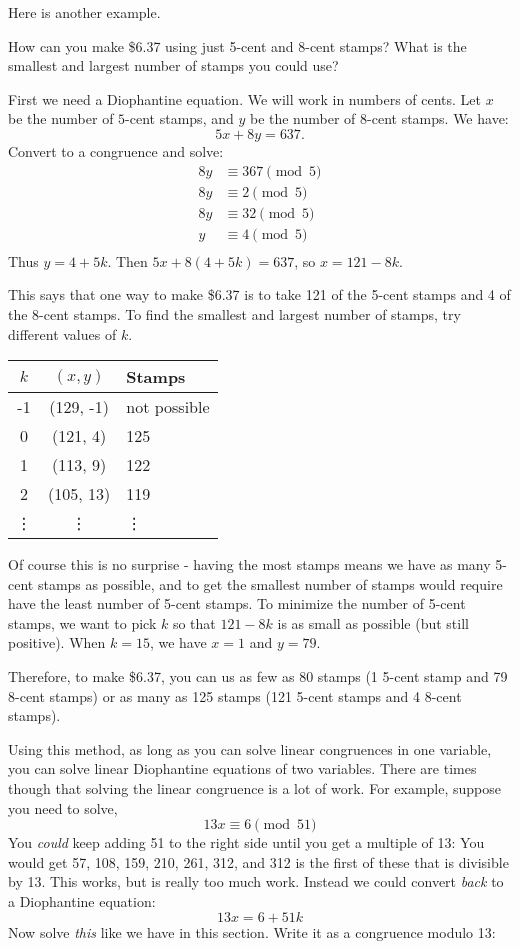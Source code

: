 \documentclass[12pt]{article}
\begin{document}
Here is another example.

\begin{example}
	How can you make \$6.37 using just 5-cent and 8-cent stamps?  What is the smallest and largest number of stamps you could use?
	
	\begin{solution}
		First we need a Diophantine equation.  We will work in numbers of cents.  Let $x$ be the number of $5$-cent stamps, and $y$ be the number of 8-cent stamps.  We have:
		\[5x + 8y = 637.\]
		Convert to a congruence and solve:
		\[
		\begin{aligned}
			8y & \equiv 367 \pmod{5}\\
				8y & \equiv 2 \pmod 5\\
				8y & \equiv 32 \pmod 5\\
				y & \equiv 4 \pmod 5\\
		\end{aligned}
		\]
		Thus $y = 4 + 5k$.  Then $5x + 8(4+5k) = 637$, so $x = 121 - 8k$.
		
		This says that one way to make \$6.37 is to take 121 of the 5-cent stamps and 4 of the 8-cent stamps.  To find the smallest and largest number of stamps, try different values of $k$.
		
		\begin{tabular}{c|c|l}
			$k$ & $(x,y)$ & Stamps\\ \hline
			-1 & (129, -1) & not possible \\
			0 & (121, 4) & 125 \\
			1 & (113, 9) & 122 \\
			2 & (105, 13) & 119 \\
			\vdots & \vdots & \vdots
		\end{tabular}
		
		Of course this is no surprise - having the most stamps means we have as many 5-cent stamps as possible, and to get the smallest number of stamps would require have the least number of 5-cent stamps.  To minimize the number of 5-cent stamps, we want to pick $k$ so that $121-8k$ is as small as possible (but still positive).  When $k = 15$, we have $x = 1$ and $y = 79$.
		
		Therefore, to make \$6.37, you can us as few as 80 stamps (1 5-cent stamp and 79 8-cent stamps) or as many as 125 stamps (121 5-cent stamps and 4 8-cent stamps).
	\end{solution}
\end{example}

Using this method, as long as you can solve linear congruences in one variable, you can solve linear Diophantine equations of two variables.  There are times though that solving the linear congruence is a lot of work.  For example, suppose you need to solve,
\[13x \equiv 6 \pmod{51}\]
You {\em could} keep adding 51 to the right side until you get a multiple of 13: You would get 57, 108, 159, 210, 261, 312, and 312 is the first of these that is divisible by 13.  This works, but is really too much work.  Instead we could convert {\em back} to a Diophantine equation:
\[13x = 6 + 51k\]
Now solve {\em this} like we have in this section.  Write it as a congruence modulo 13:
\end{document}
